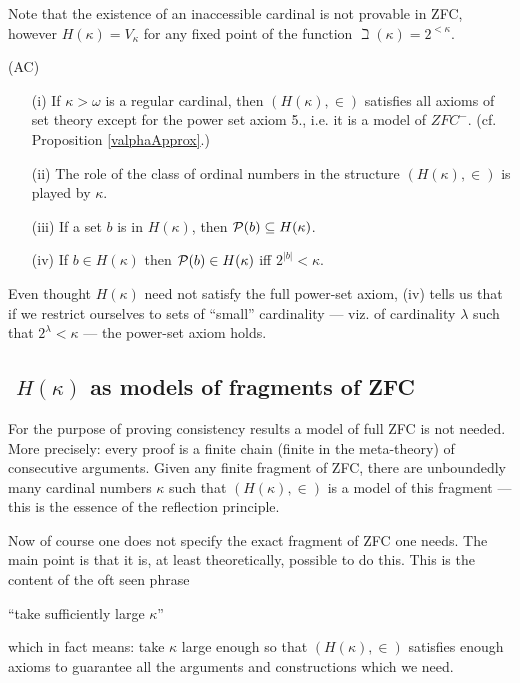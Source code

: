 Note that the existence of an inaccessible cardinal is not provable in ZFC, however $H(\kappa)=V_\kappa$
for any fixed point of the function $\beth(\kappa)=2^{<\kappa}$.

\begin{proposition}{\rm (AC)}\label{Hkappa2}
\begin{itemize}
 \item[(i)] If $\kappa>\omega$ is a regular cardinal, then $(H(\kappa),\in)$ satisfies all axioms of set theory
 except for the power set axiom 5., i.e. it is a model of $ZFC^-$. (cf. Proposition \ref{valphaApprox}.)
 \item[(ii)] The role of the class of ordinal numbers in the structure $(H(\kappa),\in)$ is played by $\kappa$. %
 \item[(iii)] If a set $b$ is in $H(\kappa)$, then ${{\mathcal P}}(b)\subseteq H(\kappa)$.
 \item[(iv)] If $b\in H(\kappa)$ then ${{\mathcal P}}(b)\in H(\kappa)$ iff $2^{|b|}<\kappa$.
\end{itemize}
\end{proposition}
\begin{note} Even thought $H(\kappa)$ need not satisfy the full power-set axiom, (iv) tells us that
if we restrict ourselves to sets of ``small'' cardinality --- viz. of cardinality $\lambda$ such that $2^\lambda <\kappa$ ---
the power-set axiom holds.
\end{note}

\subsection{${}$ \hspace{-1em}$H(\kappa)$ as models of fragments of ZFC}
For the purpose of proving
consistency results a model of full ZFC is not needed. More precisely: every proof is a finite
chain (finite in the met\hbox{a-t}heory) of consecutive arguments. Given any finite fragment of ZFC,
there are unboundedly many cardinal numbers $\kappa$ such that $(H(\kappa),\in)$ is a model of
this fragment --- this is the essence of the reflection principle.

Now of course one does not specify the exact fragment of ZFC one needs. The main point
is that it is, at least theoretically, possible to do this. This is the content of the oft
seen phrase

\begin{center}
 ``take sufficiently large $\kappa$''
\end{center}
which in fact means: take $\kappa$ large enough so that $(H(\kappa),\in)$ satisfies
enough axioms to guarantee all the arguments and constructions which we need.

